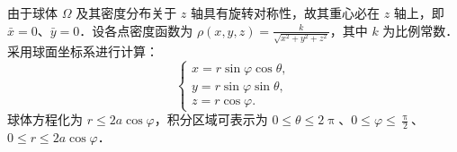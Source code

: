 \begin{solution}
    由于球体 $\Omega$ 及其密度分布关于 $z$ 轴具有旋转对称性，故其重心必在 $z$ 轴上，即 $\bar{x} = 0$、$\bar{y} = 0$．设各点密度函数为 $\rho(x, y, z) = \frac{k}{\sqrt{x^2 + y^2 + z^2}}$，其中 $k$ 为比例常数．采用球面坐标系进行计算：
    \begin{equation}
        \label{eq:Coordinate-Transformation-1}
        \begin{cases}
            x = r \sin \varphi \cos \theta, \\
            y = r \sin \varphi \sin \theta, \\
            z = r \cos \varphi.
        \end{cases}
    \end{equation}
    球体方程化为 $r \leqslant 2a \cos \varphi$，积分区域可表示为 $0 \leqslant \theta \leqslant 2\uppi$、$0 \leqslant \varphi \leqslant \frac{\uppi}{2}$、$0 \leqslant r \leqslant 2a \cos \varphi$．


\end{solution}
